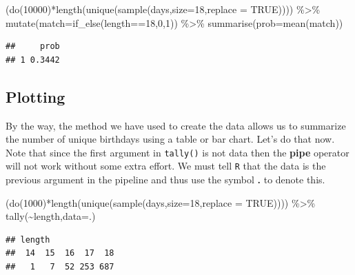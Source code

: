 \documentclass[
]{book}
\newenvironment{Shaded}{\begin{snugshade}}{\end{snugshade}}
\newcommand{\AttributeTok}[1]{\textcolor[rgb]{0.77,0.63,0.00}{#1}}
\newcommand{\ConstantTok}[1]{\textcolor[rgb]{0.00,0.00,0.00}{#1}}
\newcommand{\DecValTok}[1]{\textcolor[rgb]{0.00,0.00,0.81}{#1}}
\newcommand{\FunctionTok}[1]{\textcolor[rgb]{0.00,0.00,0.00}{#1}}
\newcommand{\NormalTok}[1]{#1}
\newcommand{\SpecialCharTok}[1]{\textcolor[rgb]{0.00,0.00,0.00}{#1}}
\begin{document}
\begin{Shaded}
\begin{Highlighting}[]
\NormalTok{(}\FunctionTok{do}\NormalTok{(}\DecValTok{10000}\NormalTok{)}\SpecialCharTok{*}\FunctionTok{length}\NormalTok{(}\FunctionTok{unique}\NormalTok{(}\FunctionTok{sample}\NormalTok{(days,}\AttributeTok{size=}\DecValTok{18}\NormalTok{,}\AttributeTok{replace =} \ConstantTok{TRUE}\NormalTok{)))) }\SpecialCharTok{\%\textgreater{}\%}
  \FunctionTok{mutate}\NormalTok{(}\AttributeTok{match=}\FunctionTok{if\_else}\NormalTok{(length}\SpecialCharTok{==}\DecValTok{18}\NormalTok{,}\DecValTok{0}\NormalTok{,}\DecValTok{1}\NormalTok{)) }\SpecialCharTok{\%\textgreater{}\%}
  \FunctionTok{summarise}\NormalTok{(}\AttributeTok{prob=}\FunctionTok{mean}\NormalTok{(match))}
\end{Highlighting}
\end{Shaded}

\begin{verbatim}
##     prob
## 1 0.3442
\end{verbatim}

\hypertarget{plotting}{%
\subsection{Plotting}\label{plotting}}

By the way, the method we have used to create the data allows us to summarize the number of unique birthdays using a table or bar chart. Let's do that now. Note that since the first argument in \texttt{tally()} is not data then the \textbf{pipe} operator will not work without some extra effort. We must tell \texttt{R} that the data is the previous argument in the pipeline and thus use the symbol \textbf{.} to denote this.

\begin{Shaded}
\begin{Highlighting}[]
\NormalTok{(}\FunctionTok{do}\NormalTok{(}\DecValTok{1000}\NormalTok{)}\SpecialCharTok{*}\FunctionTok{length}\NormalTok{(}\FunctionTok{unique}\NormalTok{(}\FunctionTok{sample}\NormalTok{(days,}\AttributeTok{size=}\DecValTok{18}\NormalTok{,}\AttributeTok{replace =} \ConstantTok{TRUE}\NormalTok{)))) }\SpecialCharTok{\%\textgreater{}\%}
  \FunctionTok{tally}\NormalTok{(}\SpecialCharTok{\textasciitilde{}}\NormalTok{length,}\AttributeTok{data=}\NormalTok{.)}
\end{Highlighting}
\end{Shaded}

\begin{verbatim}
## length
##  14  15  16  17  18 
##   1   7  52 253 687
\end{verbatim}
\end{document}
